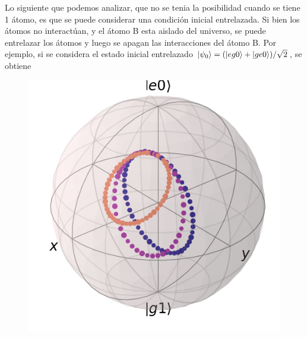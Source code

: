 Lo siguiente que podemos analizar, que no se tenia la posibilidad cuando se tiene 1 átomo, es que se puede considerar una condición inicial entrelazada. Si bien los átomos no interactúan, y el átomo B esta aislado del universo, se puede entrelazar los átomos y luego se apagan las interacciones del átomo B. Por ejemplo, si se considera el estado inicial entrelazado $\ket{\psi_0}=(\ket{eg0}+\ket{ge0})/\sqrt{2}$, se obtiene 
\begin{figure}[H]
    \begin{minipage}[c]{0.67\textwidth}
        \includegraphics[width=\textwidth]{figuras/ch4/bloch eg0+ge0 bloch AC a=0 d=2.0 x=0.0 k=0.0 J=0.0 gamma=0.0 p=0.0.png}
    \end{minipage}\hfill
    \begin{minipage}[c]{0.3\textwidth}
    \caption{
         } \label{fig4:bloch delta}
  \end{minipage}
\end{figure}
